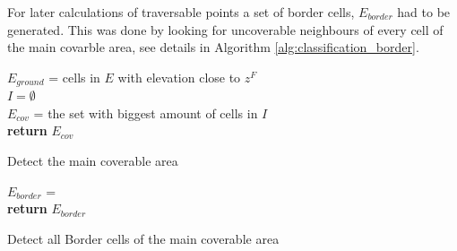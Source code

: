 For later calculations of traversable points a set of border cells, $E_{border}$ had to be generated. This was done by looking for uncoverable neighbours of every cell of the main covarble area, see details in Algorithm \ref{alg:classification_border}. 

\begin{algorithm}[H]
\SetAlgoLined
{}
 $E_{ground}$ = \textup{cells in $E$ with elevation close to $z^F$} \\
 $I = \emptyset$ \\
$E_{cov}$ = \textup{the set with biggest amount of cells in $I$} \\
\textup{\textbf{return} $E_{cov}$} 
 \caption{Detect the main coverable area}
 \label{alg:classification_coverable}
\end{algorithm}

\begin{algorithm}[H]
\SetAlgoLined
{}
$E_{border}$ = \emptyset \\
\textup{\textbf{return} $E_{border}$ } 
 \caption{Detect all Border cells of the main coverable area}
 \label{alg:classification_border}
\end{algorithm}

